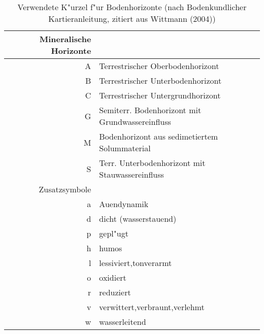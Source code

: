 \documentclass[titlepage,a4paper]{article}
\begin{document}
    \begin{table}
        \begin{center}
        
        \begin{tabular}{|rl|}
        \hline
        Mineralische Horizonte & \\
        \hline %
        A & Terrestrischer Oberbodenhorizont \\
        B & Terrestrischer Unterbodenhorizont \\
        C & Terrestrischer Untergrundhorizont \\
        G & Semiterr. Bodenhorizont mit Grundwassereinfluss \\
        M & Bodenhorizont aus sedimetiertem Solummaterial \\
        S & Terr. Unterbodenhorizont mit Stauwassereinfluss \\
        \hline \hline
        Zusatzsymbole & \\
        \hline %
        a & Auendynamik \\
        d & dicht (wasserstauend) \\
        p & gepl"ugt \\
        h & humos \\
        l & lessiviert,tonverarmt \\
        o & oxidiert \\
        r & reduziert \\
        v & verwittert,verbraunt,verlehmt \\
        w & wasserleitend \\
        \hline
        \end{tabular}
        
        \end{center}
        \caption{Verwendete K"urzel f"ur Bodenhorizonte (nach Bodenkundlicher Kartieranleitung, zitiert aus Wittmann (2004))}
        \label{kuerzel}
        \end{table}
\end{document}
